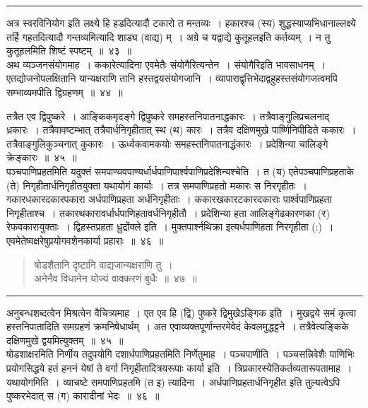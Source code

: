 \documentclass[11pt, openany]{book}
\begin{document}
\vspace{2mm}
\hrule

\vspace{2mm}
\noindent
अत्र स्वरविनियोग इति लक्ष्ये हि हडदित्यादौ टकारो त मन्तव्यः~। हकारश्च (स्य) शुद्धस्याप्यभिधानाल्लक्ष्ये तर्हि गहतदित्यादौ गन्तव्यमित्यादि शाड्य (वाद्य) म्~। अग्रे च यद्वाद्ये कुतूहलइति कर्तव्यम्~। न तु कुतूहलमिति शिष्टं स्पष्टम्~॥~४३~॥\\

अथ व्यञ्जनसंयोगमाह~। {\qtt ककारेत्या}दिना {\qtt एवमेतैः संयोगैरित्यन्तेन}~। {\qtt संयोगैरि}इति भावसाधनम्~। एतद्योजनोपलक्षितानि यान्यक्षराणि तानि हस्तद्वयसंयोगजानि~। व्यापाराद्वृत्तिभेदाद्वहुहस्तसंयोगजत्वमपि सम्भाव्यमपीति द्विग्रहणम्~॥~४४~॥

\newpage

{\qt तत्रैत एव द्विपुष्करे~। आङ्किकमृदङ्गे द्विपुष्करे समहस्तनिपातनाद्धकारः~। तत्रैवाङ्गुलिप्रचलनाद् ध्रकारः~। तत्रैवावष्टम्भात् तत्रैवार्धनिगृहीतात् स्थ (थ) कारः~। तत्रैव दक्षिणमुखे पार्ष्णिनिपीडिते ककारः~। तत्रैवाङ्गुलिकुञ्चनात् कुकारः~। ऊर्ध्वकवामकयोः समहस्तनिपातनाद्धंकारः~। प्रदेशिन्या चालिङ्गे क्रेङ्कारः~॥~४५~॥}\\

{\qt पञ्चपाणिप्रहतमिति यदुक्तं समपाण्यवपाण्यर्धार्धपाणिपार्श्वपाणिप्रदेशिन्यश्चेति~। त (य) एतेपञ्चपाणिप्रहताके (ते) निगृहीतार्धनिगृहीतयुक्ता यथायोगं कार्याः~। तत्र समपाणिप्रहतो मकारः स निरगृहीतः~। गकारधकारदकारपकारा अर्धपाणिप्रहता अर्धनिगृहीताः~। ककारखकारटकारदकाराः पार्श्वपाणिप्रहता निगृहीताश्च~। तकारथकारावर्धार्धपाणिहतावर्धनिगृहीतौ~। प्रदेशिन्या हता आलिङ्गेढकारणका (र) रेफवकारायुक्ताः~। द्विहस्तप्रहता ध्रुद्रोंक्ले इति~। मुक्तपार्श्नथिक्रा इत्यर्धपाणिहता निरगृहीता (:)~। एवमेतेष्वक्षरेषुप्रयोगवशेनकार्या प्रहाराः~॥~४६~॥}

\begin{quote}
{\na  षोडशैतानि दृष्टानि वाद्यजान्यक्षराणि तु~।\\
 अनेनैव विधानेन योज्यं वाक्करणं बुधैः~॥~४७~॥}
\end{quote}

\hrule

\vspace{2mm}
अनुबन्धशब्दत्वेन मिश्रत्वेन वैचित्र्यमाह~। {\qtt एत एव हि (द्वि) पुष्करे द्विमुखेऽङ्गिक} इति~। मुखद्वये  समं कृत्वा हस्तनिपातादिति समग्रहणं क्रमनिषेधार्थम्~। अत एवाव्यक्तपूर्णान्तरमेवेदं केवलमुद्धट्टने~। तत्रैवेत्यङ्किके दक्षिणमुखे द्वयमित्युक्तम्~॥~४५~॥\\

{\qtt षोडशाक्षरमिति निर्णीय} तदुपयोगि दशार्धपाणिप्रहतमिति निर्णेतुमाह~। {\qtt पञ्चपाणीति~।} पञ्चसन्निवेशैः पाणिभिः प्रयोगसिद्धये हतं हननं येषां ते वर्गा निगृहीतादित्रयरूपाः कार्या इति~। त्रिप्रकारस्येतिकर्तव्यतारूपतामाह~। {\qtt यथायोगमिति~।} व्याचष्टे समपाणिप्रहतमि (त इ) त्यादिना~। अर्धपाणिप्रहतार्धनिगृहीत इति तुल्यत्वेऽपि पुष्करभेदात् स (ग) कारादीनां भेदः~॥~४६~॥\\
\end{document}
